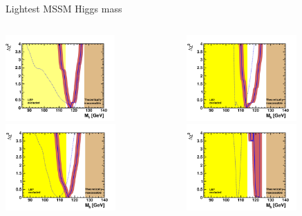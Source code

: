 \documentclass{beamer}
\begin{document}
\begin{frame}{Lightest MSSM Higgs mass}
  \begin{columns}
    \begin{column}{0.5\textwidth}
      \includegraphics[height=3.3cm]{mh/nuhm1.pdf}\vfill 
      \includegraphics[height=3.3cm]{mh/cmssm.pdf}
    \end{column}
    \begin{column}{0.5\textwidth}
      \includegraphics[height=3.3cm]{mh/vcmssm.pdf}\vfill 
      \includegraphics[height=3.3cm]{mh/msugra.pdf}
    \end{column}
  \end{columns}
\end{frame}
\end{document}
